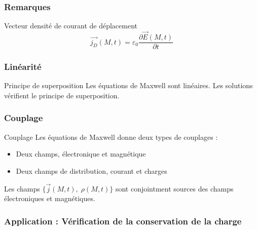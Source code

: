 \subsubsection{Remarques} %
\label{sec:Remarques}

\begin{Definition}[colbacktitle=red!75!black]{Vecteur densité de courant de déplacement}{}
\begin{equation}
  \overrightarrow{j_D}(M,t) = \varepsilon_0 \frac{\partial \overrightarrow{E}(M,t)}{\partial t} 
\end{equation}
\end{Definition}


\subsubsection{Linéarité} %
\label{sec:Linéarité}


\begin{Prop}{Principe de superposition}{}
Les équations de Maxwell sont linéaires. Les solutions vérifient le principe de superposition. 
\end{Prop}

\subsubsection{Couplage} %
\label{sec:Couplage}

\begin{Prop}{Couplage}{}
Les équations de Maxwell donne deux types de couplages :
\begin{itemize}

    \item Deux champs, électronique et magnétique
    \item Deux champs de distribution, courant et charges

\end{itemize}

Les champs $\{\overrightarrow{j}(M,t), \; \rho(M,t)\}$ sont conjointment sources des champs électroniques et magnétiques.

\end{Prop}

\subsubsection{Application : Vérification de la conservation de la charge} %

